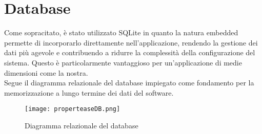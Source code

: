 \def\baselinestretch{1}
\chapter{Database} \label{db}
\def\baselinestretch{1.66}

\noindent Come sopracitato, è stato utilizzato SQLite in quanto la natura embedded permette di incorporarlo direttamente nell'applicazione, rendendo la gestione dei dati più agevole e contribuendo a ridurre la complessità della configurazione del sistema. Questo è particolarmente vantaggioso per un'applicazione di medie dimensioni come la nostra.\\
\noindent Segue il diagramma relazionale del database impiegato come fondamento per la memorizzazione a lungo termine dei dati del software.

\begin{figure}[h]
\centering
\texttt{[image: properteaseDB.png]}
\caption{Diagramma relazionale del database}
\end{figure}